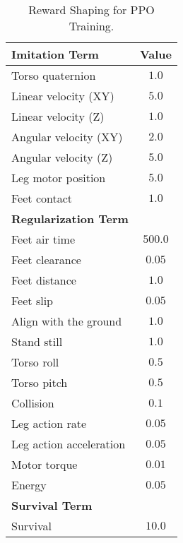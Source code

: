 \begin{table}[t]
\centering
\caption{Reward Shaping for PPO Training.}
\setlength{\tabcolsep}{7pt}
\begin{threeparttable}
\begin{tabular}{lc}
\toprule
\textbf{Imitation Term} & \textbf{Value} \\ 
\midrule
Torso quaternion & $1.0$ \\ 
Linear velocity (XY) & $5.0$ \\ 
Linear velocity (Z) & $1.0$ \\ 
Angular velocity (XY) & $2.0$ \\ 
Angular velocity (Z) & $5.0$ \\ 
Leg motor position & $5.0$ \\
Feet contact & $1.0$ \\ 
\midrule
\textbf{Regularization Term} & \\ 
\midrule
Feet air time & $500.0$ \\
Feet clearance & $0.05$ \\
Feet distance & $1.0$ \\
Feet slip & $0.05$ \\
Align with the ground & $1.0$ \\
Stand still & $1.0$ \\
Torso roll & $0.5$ \\ 
Torso pitch & $0.5$ \\
Collision & $0.1$ \\
Leg action rate & $0.05$ \\ 
Leg action acceleration & $0.05$ \\ 
Motor torque & $0.01$ \\ 
Energy & $0.05$ \\ 
\midrule
\textbf{Survival Term} & \\ 
\midrule
Survival & $10.0$ \\ 
\bottomrule
\end{tabular}
\end{threeparttable}

\label{tab:reward_scales}
\vspace{-4mm}
\end{table}